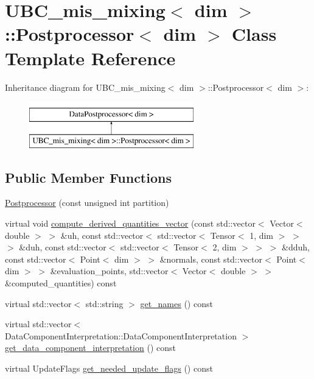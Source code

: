 \hypertarget{class_u_b_c__mis__mixing_1_1_postprocessor}{}\section{U\+B\+C\+\_\+mis\+\_\+mixing$<$ dim $>$\+:\+:Postprocessor$<$ dim $>$ Class Template Reference}
\label{class_u_b_c__mis__mixing_1_1_postprocessor}
Inheritance diagram for U\+B\+C\+\_\+mis\+\_\+mixing$<$ dim $>$\+:\+:Postprocessor$<$ dim $>$\+:\begin{figure}[H]
\begin{center}
\leavevmode
\includegraphics[height=2.000000cm]{class_u_b_c__mis__mixing_1_1_postprocessor}
\end{center}
\end{figure}
\subsection*{Public Member Functions}
\begin{DoxyCompactItemize}
\item 
\hyperlink{class_u_b_c__mis__mixing_1_1_postprocessor_ac74c98c423a4fe0dba8f9ef9279c0607}{Postprocessor} (const unsigned int partition)
\item 
virtual void \hyperlink{class_u_b_c__mis__mixing_1_1_postprocessor_ae5ca8f1ef4eb8c682f2c322e7d47b85c}{compute\+\_\+derived\+\_\+quantities\+\_\+vector} (const std\+::vector$<$ Vector$<$ double $>$ $>$ \&uh, const std\+::vector$<$ std\+::vector$<$ Tensor$<$ 1, dim $>$ $>$ $>$ \&duh, const std\+::vector$<$ std\+::vector$<$ Tensor$<$ 2, dim $>$ $>$ $>$ \&dduh, const std\+::vector$<$ Point$<$ dim $>$ $>$ \&normals, const std\+::vector$<$ Point$<$ dim $>$ $>$ \&evaluation\+\_\+points, std\+::vector$<$ Vector$<$ double $>$ $>$ \&computed\+\_\+quantities) const 
\item 
virtual std\+::vector$<$ std\+::string $>$ \hyperlink{class_u_b_c__mis__mixing_1_1_postprocessor_a05ee9a5d6d913c2fe41cb67f9f6f3893}{get\+\_\+names} () const 
\item 
virtual std\+::vector$<$ Data\+Component\+Interpretation\+::\+Data\+Component\+Interpretation $>$ \hyperlink{class_u_b_c__mis__mixing_1_1_postprocessor_a3038fa1744200de88fe27c335ded7a39}{get\+\_\+data\+\_\+component\+\_\+interpretation} () const 
\item 
virtual Update\+Flags \hyperlink{class_u_b_c__mis__mixing_1_1_postprocessor_a002ab5928ee9d405325b9804355ccb9c}{get\+\_\+needed\+\_\+update\+\_\+flags} () const 
\end{DoxyCompactItemize}


